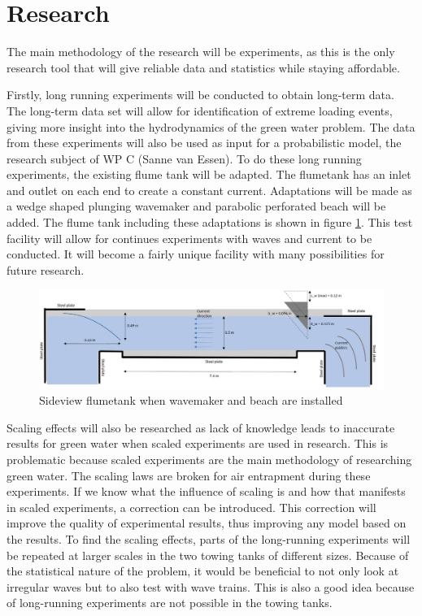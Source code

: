 \section{Research}
\label{sec:research_topics}
The main methodology of the research will be experiments, as this is the only research tool that will give reliable data and statistics while staying affordable. 
\par 
Firstly, long running experiments will be conducted to obtain long-term data. The long-term data set will allow for identification of extreme loading events, giving more insight into the hydrodynamics of the green water problem. The data from these experiments will also be used as input for a probabilistic model, the research subject of WP C (Sanne van Essen). To do these long running experiments, the existing flume tank will be adapted. The flumetank has an inlet and outlet on each end to create a constant current. Adaptations will be made as a wedge shaped plunging wavemaker and parabolic perforated beach will be added. The flume tank including these adaptations is shown in figure \ref{fig:flumetank}. This test facility will allow for continues experiments with waves and current to be conducted. It will become a fairly unique facility with many possibilities for future research.
\begin{figure}[h]
	\centering
	\includegraphics[width=\linewidth]{figs/FlumetankScetch.png}
	\caption{Sideview flumetank when wavemaker and beach are installed}
	\label{fig:flumetank}
\end{figure}
\par 
Scaling effects will also be researched as lack of knowledge leads to inaccurate results for green water when scaled experiments are used in research. This is problematic because scaled experiments are the main methodology of researching green water. The scaling laws are broken for air entrapment during these experiments. If we know what the influence of scaling is and how that manifests in scaled experiments, a correction can be introduced. This correction will improve the quality of experimental results, thus improving any model based on the results. To find the scaling effects, parts of the long-running experiments will be repeated at larger scales in the two towing tanks of different sizes. Because of the statistical nature of the problem, it would be beneficial to not only look at irregular waves but to also test with wave trains. This is also a good idea because of long-running experiments are not possible in the towing tanks. 
